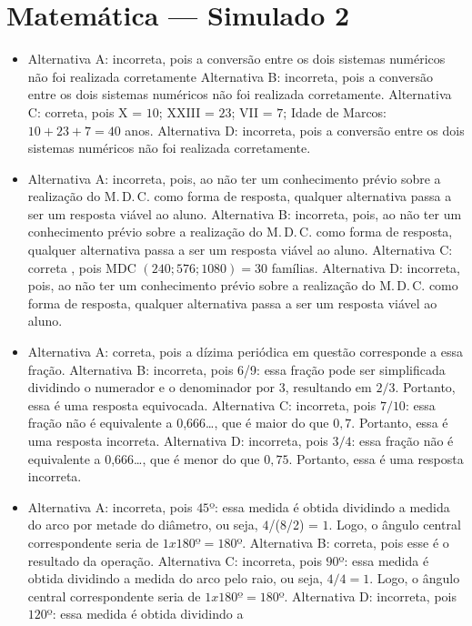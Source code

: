 \section*{Matemática — Simulado 2}

\begin{itemize}
\item Alternativa A: incorreta, pois a conversão entre os dois sistemas
numéricos não foi realizada corretamente
Alternativa B: incorreta, pois a conversão entre os dois sistemas
numéricos não foi realizada corretamente.
Alternativa C: correta, pois X = $10$; XXIII = $23$; VII = $7$; Idade de Marcos: $10 + 23 + 7 = 40$ anos.
Alternativa D: incorreta, pois a conversão entre os dois sistemas
numéricos não foi realizada corretamente.
\item Alternativa A: incorreta, pois, ao não ter um conhecimento prévio sobre
a realização do M.\,D.\,C. como forma de resposta, qualquer alternativa
passa a ser um resposta viável ao aluno.
Alternativa B: incorreta, pois, ao não ter um conhecimento prévio sobre
a realização do M.\,D.\,C. como forma de resposta, qualquer alternativa
passa a ser um resposta viável ao aluno.
Alternativa C: correta , pois MDC $(240; 576; 1 080) = 30$ famílias.
Alternativa D: incorreta, pois, ao não ter um conhecimento prévio sobre
a realização do M.\,D.\,C. como forma de resposta, qualquer alternativa
passa a ser um resposta viável ao aluno.
\item Alternativa A: correta, pois a dízima periódica em questão corresponde a
essa fração.
Alternativa B: incorreta, pois $6$/9: essa fração pode ser simplificada
dividindo o numerador e o denominador por $3$, resultando em $2/3$.
Portanto, essa é uma resposta equivocada.
Alternativa C: incorreta, pois $7/10$: essa fração não é equivalente a
0,666\ldots, que é maior do que $0,7$. Portanto, essa é uma resposta
incorreta.
Alternativa D: incorreta, pois $3/4$: essa fração não é equivalente a
0,666\ldots, que é menor do que $0,75$. Portanto, essa é uma resposta
incorreta.
\item Alternativa A: incorreta, pois $45$º: essa medida é obtida dividindo a
medida do arco por metade do diâmetro, ou seja, $4$/(8/2) = $1$. Logo, o
ângulo central correspondente seria de $1 x 180º = 180$º.
Alternativa B: correta, pois esse é o resultado da operação.
Alternativa C: incorreta, pois $90$º: essa medida é obtida dividindo a
medida do arco pelo raio, ou seja, $4/4 = 1$. Logo, o ângulo central
correspondente seria de $1 x 180º = 180$º.
Alternativa D: incorreta, pois $120$º: essa medida é obtida dividindo a

\end{itemize}
